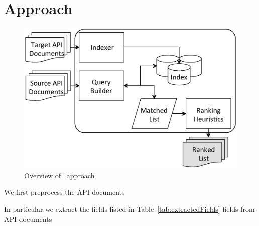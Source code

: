 \section{Approach}
\label{sec:approach}

\begin{figure}
	\begin{center}
		\includegraphics[scale=0.45,clip=true, trim=100pt 80pt 100pt 100pt]{ApproahOverview.eps}
		\caption{\label{fig:approachOverview} Overview of \tool\ approach}
	\end{center}
\end{figure}




We first preprocess the API documents

In particular we extract the fields listed in Table~\ref{tab:extractedFields} fields from API documents

